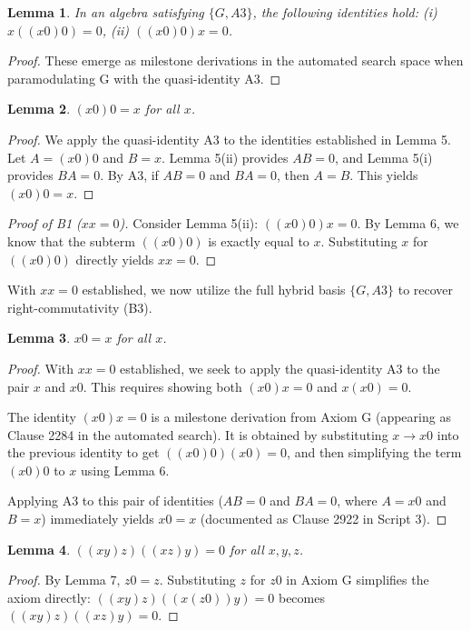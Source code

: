 \documentclass[11pt, a4paper]{article}
\newtheorem{lemma}{Lemma}
\begin{document}
\begin{lemma}
In an algebra satisfying $\{G, A3\}$, the following identities hold: (i) $x((x0)0) = 0$, (ii) $((x0)0)x = 0$. 
\end{lemma}
\begin{proof}
These emerge as milestone derivations in the automated search space when paramodulating G with the quasi-identity A3.
\end{proof}

\begin{lemma}
$(x0)0 = x$ for all $x$.
\end{lemma}
\begin{proof}
We apply the quasi-identity A3 to the identities established in Lemma 5. Let $A = (x0)0$ and $B = x$. Lemma 5(ii) provides $AB = 0$, and Lemma 5(i) provides $BA = 0$. By A3, if $AB = 0$ and $BA = 0$, then $A = B$. This yields $(x0)0 = x$.
\end{proof}

\begin{proof}[Proof of B1 ($xx = 0$)]
Consider Lemma 5(ii): $((x0)0)x = 0$. By Lemma 6, we know that the subterm $((x0)0)$ is exactly equal to $x$. Substituting $x$ for $((x0)0)$ directly yields $xx = 0$.
\end{proof}

\noindent With $xx = 0$ established, we now utilize the full hybrid basis $\{G, A3\}$ to recover right-commutativity (B3).

\begin{lemma}
$x0 = x$ for all $x$.
\end{lemma}
\begin{proof}
With $xx = 0$ established, we seek to apply the quasi-identity A3 to the pair $x$ and $x0$. This requires showing both $(x0)x = 0$ and $x(x0) = 0$.

 \vspace{0.5em}
\noindent The identity $(x0)x = 0$ is a milestone derivation from Axiom G (appearing as Clause 2284 in the automated search). It is obtained by substituting $x \to x0$ into the previous identity to get $((x0)0)(x0) = 0$, and then simplifying the term $(x0)0$ to $x$ using Lemma 6.

 \vspace{0.5em}
\noindent 
Applying A3 to this pair of identities ($AB = 0$ and $BA = 0$, where $A = x0$ and $B = x$) immediately yields $x0 = x$ (documented as Clause 2922 in Script 3).
\end{proof}

\begin{lemma}
$((xy)z)((xz)y) = 0$ for all $x, y, z$.
\end{lemma}
\begin{proof}
By Lemma 7, $z0 = z$. Substituting $z$ for $z0$ in Axiom G simplifies the axiom directly:
$((xy)z)((x(z0))y) = 0$ becomes $((xy)z)((xz)y) = 0$.
\end{proof}
\end{document}
